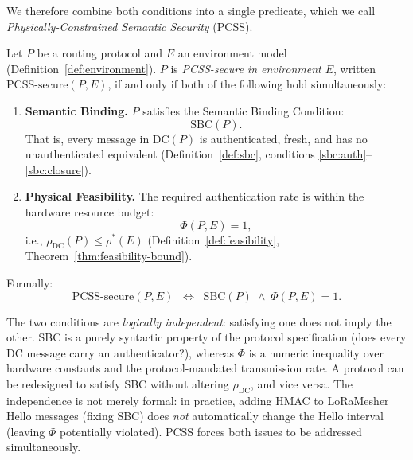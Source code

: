 We therefore combine both conditions into a single predicate, which we
call \emph{Physically-Constrained Semantic Security} (PCSS).

\begin{definition}
\label{def:pcss-secure}
Let $P$ be a routing protocol and $E$ an environment model
(Definition~\ref{def:environment}).
$P$ is \emph{PCSS-secure in environment $E$}, written
$\mathrm{PCSS\text{-}secure}(P,E)$, if and only if both of the following
hold simultaneously:
\begin{enumerate}[label=\textbf{PC\arabic*}., ref=PC\arabic*]
  \item \label{pc:sbc}
        \textbf{Semantic Binding.}\quad
        $P$ satisfies the Semantic Binding Condition:
        \[
          \mathrm{SBC}(P).
        \]
        That is, every message in $\mathrm{DC}(P)$ is authenticated,
        fresh, and has no unauthenticated equivalent
        (Definition~\ref{def:sbc}, conditions \ref{sbc:auth}–\ref{sbc:closure}).

  \item \label{pc:phi}
        \textbf{Physical Feasibility.}\quad
        The required authentication rate is within the hardware
        resource budget:
        \[
          \Phi(P, E) = 1,
        \]
        i.e., $\rho_{\mathrm{DC}}(P) \le \rho^*(E)$
        (Definition~\ref{def:feasibility}, Theorem~\ref{thm:feasibility-bound}).
\end{enumerate}
Formally:
\[
  \mathrm{PCSS\text{-}secure}(P, E)
  \;\;\Longleftrightarrow\;\;
  \mathrm{SBC}(P) \;\wedge\; \Phi(P, E) = 1.
\]
\end{definition}

\begin{remark}
\label{rem:pcss-independence}
The two conditions are \emph{logically independent}: satisfying one does
not imply the other.  SBC is a purely syntactic property of the protocol
specification (does every DC message carry an authenticator?), whereas
$\Phi$ is a numeric inequality over hardware constants and the
protocol-mandated transmission rate.  A protocol can be redesigned to
satisfy SBC without altering $\rho_{\mathrm{DC}}$, and vice versa.
The independence is not merely formal: in practice, adding HMAC to
LoRaMesher Hello messages (fixing SBC) does \emph{not} automatically
change the Hello interval (leaving $\Phi$ potentially violated).  PCSS
forces both issues to be addressed simultaneously.
\end{remark}

